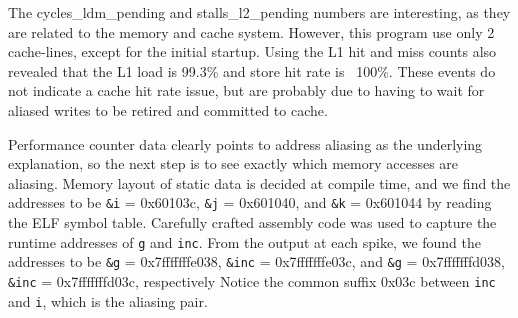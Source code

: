 \documentclass[10pt, conference, compsocconf]{IEEEtran}
\begin{document}
The cycles\_ldm\_pending and stalls\_l2\_pending numbers are interesting, as they are related to the memory and cache system.
However, this program use only 2 cache-lines, except for the initial startup.
Using the L1 hit and miss counts also revealed that the L1 load is 99.3\% and store hit rate is ~100\%.
These events do not indicate a cache hit rate issue, but are probably due to having to wait for aliased writes to be retired and committed to cache.

Performance counter data clearly points to address aliasing as the underlying explanation, so the next step is to see exactly which memory accesses are aliasing.
Memory layout of static data is decided at compile time, and we find the addresses to be \texttt{\&i} = 0x60103c, \texttt{\&j} = 0x601040, and \texttt{\&k} = 0x601044 by reading the ELF symbol table.
Carefully crafted assembly code was used to capture the runtime addresses of \texttt{g} and \texttt{inc}.
From the output at each spike, we found the addresses to be \texttt{\&g} = 0x7fffffffe038, \texttt{\&inc} = 0x7fffffffe03c, and \texttt{\&g} = 0x7fffffffd038, \texttt{\&inc} = 0x7fffffffd03c, respectively
Notice the common suffix 0x03c between \texttt{inc} and \texttt{i}, which is the aliasing pair.


% 
 
\end{document}
